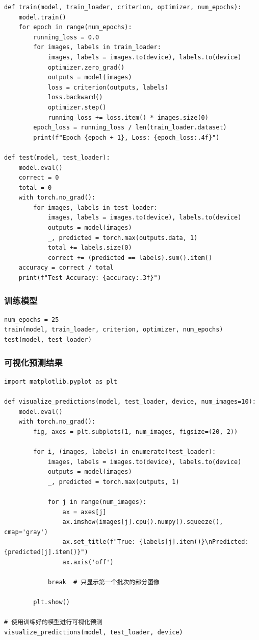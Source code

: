 \documentclass[a4paper,12pt]{article}
\begin{document}
\begin{lstlisting}
def train(model, train_loader, criterion, optimizer, num_epochs):
    model.train()
    for epoch in range(num_epochs):
        running_loss = 0.0
        for images, labels in train_loader:
            images, labels = images.to(device), labels.to(device)
            optimizer.zero_grad()
            outputs = model(images)
            loss = criterion(outputs, labels)
            loss.backward()
            optimizer.step()
            running_loss += loss.item() * images.size(0)
        epoch_loss = running_loss / len(train_loader.dataset)
        print(f"Epoch {epoch + 1}, Loss: {epoch_loss:.4f}")

def test(model, test_loader):
    model.eval()
    correct = 0
    total = 0
    with torch.no_grad():
        for images, labels in test_loader:
            images, labels = images.to(device), labels.to(device)
            outputs = model(images)
            _, predicted = torch.max(outputs.data, 1)
            total += labels.size(0)
            correct += (predicted == labels).sum().item()
    accuracy = correct / total
    print(f"Test Accuracy: {accuracy:.3f}")
\end{lstlisting}

\subsubsection{训练模型}
\begin{lstlisting}
num_epochs = 25
train(model, train_loader, criterion, optimizer, num_epochs)
test(model, test_loader)
\end{lstlisting}

\subsubsection{可视化预测结果}
\begin{lstlisting}
import matplotlib.pyplot as plt

def visualize_predictions(model, test_loader, device, num_images=10):
    model.eval()
    with torch.no_grad():
        fig, axes = plt.subplots(1, num_images, figsize=(20, 2))

        for i, (images, labels) in enumerate(test_loader):
            images, labels = images.to(device), labels.to(device)
            outputs = model(images)
            _, predicted = torch.max(outputs, 1)

            for j in range(num_images):
                ax = axes[j]
                ax.imshow(images[j].cpu().numpy().squeeze(), cmap='gray')
                ax.set_title(f"True: {labels[j].item()}\nPredicted: {predicted[j].item()}")
                ax.axis('off')

            break  # 只显示第一个批次的部分图像

        plt.show()

# 使用训练好的模型进行可视化预测
visualize_predictions(model, test_loader, device)
\end{lstlisting}
\end{document}
